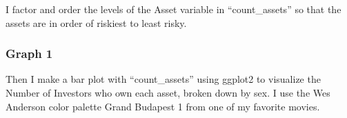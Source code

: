 \documentclass[
]{article}
\newenvironment{Shaded}{\begin{snugshade}}{\end{snugshade}}
\newcommand{\DataTypeTok}[1]{\textcolor[rgb]{0.13,0.29,0.53}{#1}}
\newcommand{\KeywordTok}[1]{\textcolor[rgb]{0.13,0.29,0.53}{\textbf{#1}}}
\newcommand{\NormalTok}[1]{#1}
\newcommand{\OperatorTok}[1]{\textcolor[rgb]{0.81,0.36,0.00}{\textbf{#1}}}
\newcommand{\OtherTok}[1]{\textcolor[rgb]{0.56,0.35,0.01}{#1}}
\newcommand{\StringTok}[1]{\textcolor[rgb]{0.31,0.60,0.02}{#1}}
\begin{document}
I factor and order the levels of the Asset variable in ``count\_assets''
so that the assets are in order of riskiest to least risky.

\begin{Shaded}
\end{Shaded}

\hypertarget{graph-1}{%
\subsubsection{Graph 1}\label{graph-1}}

Then I make a bar plot with ``count\_assets'' using ggplot2 to visualize
the Number of Investors who own each asset, broken down by sex. I use
the Wes Anderson color palette Grand Budapest 1 from one of my favorite
movies.
\end{document}
